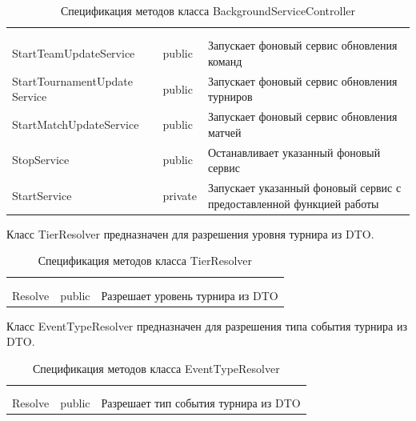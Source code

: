 \begin{xltabular}{\textwidth}{|X|X|X|}
	\caption{Спецификация методов класса BackgroundServiceController}\label{table:BackgroundServiceControllerMethods}\\ \hline
	 &  &  \\ \hline
	 &  &  \\ \hline
	\endfirsthead
	 \hline
	 &  &  \\ \hline
	\endhead
	StartTeamUpdateService & public & Запускает фоновый сервис обновления команд \\ \hline
	StartTournamentUpdate
	Service & public & Запускает фоновый сервис обновления турниров \\ \hline
	StartMatchUpdateService & public & Запускает фоновый сервис обновления матчей \\ \hline
	StopService & public & Останавливает указанный фоновый сервис \\ \hline
	StartService & private & Запускает указанный фоновый сервис с предоставленной функцией работы \\ \hline
\end{xltabular}

Класс TierResolver предназначен для разрешения уровня турнира из DTO.

\begin{xltabular}{\textwidth}{|X|X|X|}
	\caption{Спецификация методов класса TierResolver}\label{table:TierResolverMethods}\\ \hline
	 &  &  \\ \hline
	 &  &  \\ \hline
	\endfirsthead
	 \hline
	 &  &  \\ \hline
	\endhead
	Resolve & public & Разрешает уровень турнира из DTO \\ \hline
\end{xltabular}

Класс EventTypeResolver предназначен для разрешения типа события турнира из DTO.

\begin{xltabular}{\textwidth}{|X|X|X|}
	\caption{Спецификация методов класса EventTypeResolver}\label{table:EventTypeResolverMethods}\\ \hline
	 &  &  \\ \hline
	 &  &  \\ \hline
	\endfirsthead
	 \hline
	 &  &  \\ \hline
	\endhead
	Resolve & public & Разрешает тип события турнира из DTO \\ \hline
\end{xltabular}

